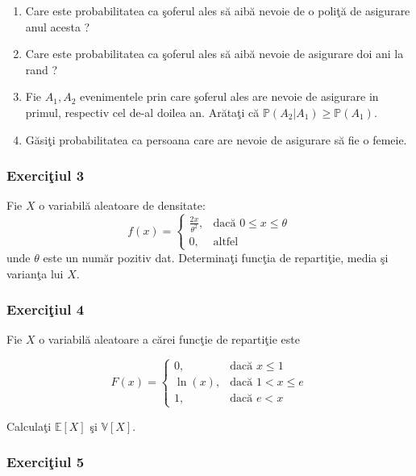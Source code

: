 \documentclass[]{article}
\def\t{{\theta}}
\def\VV{{\mathbb V}}
\def\PP{{\mathbb P}}
\def\EE{{\mathbb E}}
\begin{document}
\begin{enumerate}
\def\labelenumi{\alph{enumi})}
\item
  Care este probabilitatea ca \c soferul ales s\u a aib\u a nevoie de o
  poli\c t\u a de asigurare anul acesta ?
\item
  Care este probabilitatea ca \c soferul ales s\u a aib\u a nevoie de
  asigurare doi ani la rand ?
\item
  Fie \(A_1, A_2\) evenimentele prin care \c soferul ales are nevoie de
  asigurare in primul, respectiv cel de-al doilea an. Ar\u ata\c ti
  c\u a \(\PP(A_2|A_1)\geq\PP(A_1)\).
\item
  G\u asi\c ti probabilitatea ca persoana care are nevoie de asigurare
  s\u a fie o femeie.
\end{enumerate}

\subsubsection{\texorpdfstring{Exerci\c tiul
3}{Exerciiul 3}}\label{exerciiul-3}

Fie \(X\) o variabil\u a aleatoare de densitate: \[
  f(x) = \left\{\begin{array}{ll}
    \frac{2x}{\t^2}, & \mbox{dac\u a $0\leq x\leq \t$}\\
    0, & \mbox{altfel}
  \end{array}\right.
\] unde \(\t\) este un num\u ar pozitiv dat. Determina\c ti func\c tia
de reparti\c tie, media \c si varian\c ta lui \(X\).

\subsubsection{\texorpdfstring{Exerci\c tiul
4}{Exerciiul 4}}\label{exerciiul-4}

Fie \(X\) o variabil\u a aleatoare a c\u arei func\c tie de
reparti\c tie este

\[
  F(x) = \left\{\begin{array}{lll}
    0, & \mbox{dac\u a $x\leq1$}\\
    \ln(x), & \mbox{dac\u a $1<x\leq e$}\\
    1, & \mbox{dac\u a $e<x$}
  \end{array}\right.
\]

Calcula\c ti \(\EE[X]\) \c si \(\VV[X]\).

\subsubsection{\texorpdfstring{Exerci\c tiul
5}{Exerciiul 5}}\label{exerciiul-5}
\end{document}
